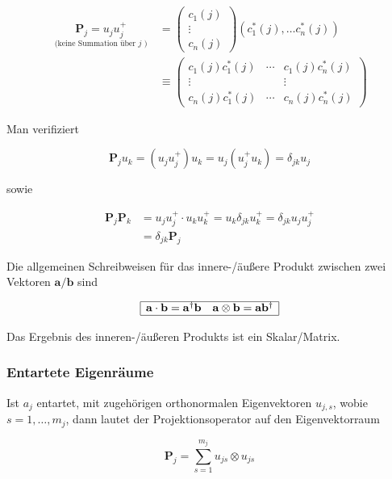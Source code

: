 \documentclass[10pt, letterpaper]{article}
\begin{document}
$$
\begin{aligned}
\underset{\text { (keine Summation über } j \text { ) }}{\mathbf{P}_{j}=u_{j} u_{j}^{+}} & =\left(\begin{array}{c}
c_{1}(j) \\
\vdots \\
c_{n}(j)
\end{array}\right)\left(c_{1}^{*}(j), \ldots c_{n}^{*}(j)\right) \\
& \equiv\left(\begin{array}{ccc}
c_{1}(j) c_{1}^{*}(j) & \cdots & c_{1}(j) c_{n}^{*}(j) \\
\vdots & & \vdots \\
c_{n}(j) c_{1}^{*}(j) & \cdots & c_{n}(j) c_{n}^{*}(j)
\end{array}\right)
\end{aligned}
$$

Man verifiziert

$$
\mathbf{P}_{j} u_{k}=\left(u_{j} u_{j}^{+}\right) u_{k}=u_{j}\left(u_{j}^{+} u_{k}\right)=\delta_{j k} u_{j}
$$

sowie

$$
\begin{aligned}
\mathbf{P}_{j} \mathbf{P}_{k} & =u_{j} u_{j}^{+} \cdot u_{k} u_{k}^{+}=u_{k} \delta_{j k} u_{k}^{+}=\delta_{j k} u_{j} u_{j}^{+} \\
& =\delta_{j k} \mathbf{P}_{j}
\end{aligned}
$$

Die allgemeinen Schreibweisen für das innere-/äußere Produkt zwischen zwei Vektoren $\mathbf{a} / \mathbf{b}$ sind

$$
\begin{array}{|ll|}
\hline \mathbf{a} \cdot \mathbf{b}=\mathbf{a}^{\dagger} \mathbf{b} & \mathbf{a} \otimes \mathbf{b}=\mathbf{a} \mathbf{b}^{\dagger} \\
\hline
\end{array}
$$

Das Ergebnis des inneren-/äußeren Produkts ist ein Skalar/Matrix.

\subsubsection*{Entartete Eigenräume}
Ist $a_{j}$ entartet, mit zugehörigen orthonormalen Eigenvektoren $u_{j, s}$, wobie $s=1, \ldots, m_{j}$, dann lautet der Projektionsoperator auf den Eigenvektorraum

$$
\mathbf{P}_{j}=\sum_{s=1}^{m_{j}} u_{j s} \otimes u_{j s}
$$
\end{document}
